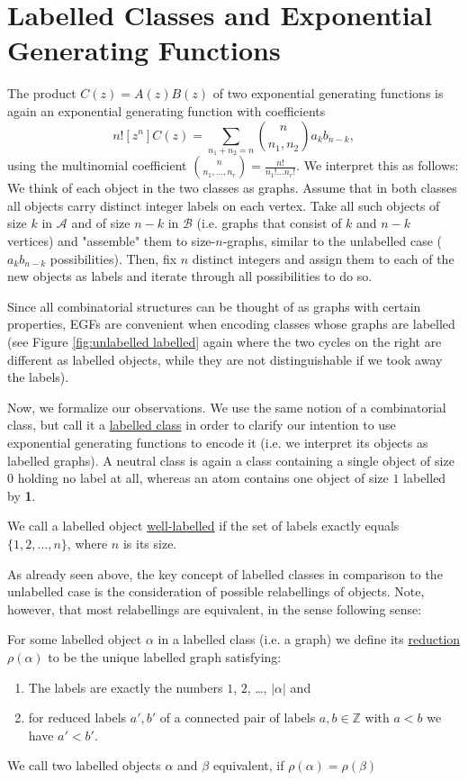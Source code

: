 \section{Labelled Classes and Exponential Generating Functions}
The product $C(z) = A(z) B(z)$ of two exponential generating functions is again an exponential generating function with coefficients
\begin{equation*}
    n![z^n] C(z) = \sum_{n_1 + n_2 = n} \binom{n}{n_1, n_2} a_k b_{n-k},
\end{equation*}
using the multinomial coefficient $\binom{n}{n_1,\dots,n_r} = \frac{n!}{n_1! \dots n_r!}$.
We interpret this as follows:
We think of each object in the two classes as graphs.
Assume that in both classes all objects carry distinct integer labels on each vertex.
Take all such objects of size $k$ in $\mathcal{A}$ and of size $n-k$ in $\mathcal{B}$ (i.e. graphs that consist of $k$ and $n-k$ vertices) and "assemble" them to size-$n$-graphs, similar to the unlabelled case ($a_k b_{n-k}$ possibilities).
Then, fix $n$ distinct integers and assign them to each of the new objects as labels and iterate through all possibilities to do so. 

Since all combinatorial structures can be thought of as graphs with certain properties, EGFs are convenient when encoding classes whose graphs are labelled (see Figure \ref{fig:unlabelled labelled} again where the two cycles on the right are different as labelled objects, while they are not distinguishable if we took away the labels).

Now, we formalize our observations. 
We use the same notion of a combinatorial class, but call it a \ul{labelled class} in order to clarify our intention to use exponential generating functions to encode it (i.e. we interpret its objects as labelled graphs).
A neutral class is again a class containing a single object of size $0$ holding no label at all, whereas an atom contains one object of size $1$ labelled by \textbf{1}.

We call a labelled object \ul{well-labelled} if the set of labels exactly equals $\{ 1, 2, \dots, n \}$, where $n$ is its size.

As already seen above, the key concept of labelled classes in comparison to the unlabelled case is the consideration of possible relabellings of objects.
Note, however, that most relabellings are equivalent, in the sense following sense:

\begin{defn}
For some labelled object $\alpha$ in a labelled class (i.e. a graph) we define its \ul{reduction} $\rho(\alpha)$ to be the unique labelled graph satisfying:
\begin{enumerate}
    \item The labels are exactly the numbers $1$, $2$, \dots, $|\alpha|$ and
    \item for reduced labels $a', b'$ of a connected pair of labels $a, b \in \mathbb{Z}$ with $a < b$ we have $a' < b'$. 
\end{enumerate}
We call two labelled objects $\alpha$ and $\beta$ equivalent, if $\rho(\alpha) = \rho(\beta)$
\end{defn}

